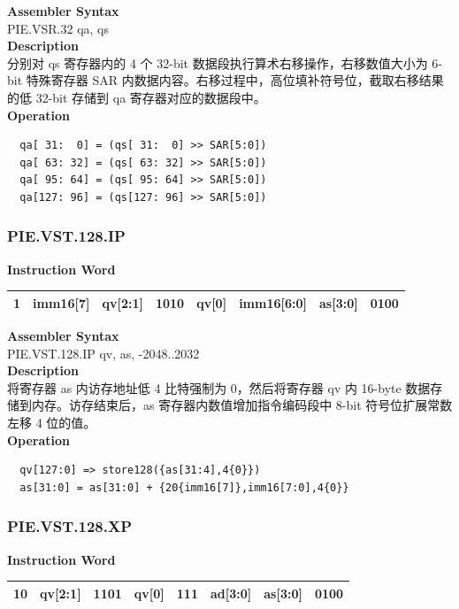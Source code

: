 \textbf{Assembler Syntax} \\
PIE.VSR.32 qa, qs \\
\textbf{Description} \\
分别对 qs 寄存器内的 4 个 32-bit 数据段执行算术右移操作，右移数值大小为 6-bit 特殊寄存器 SAR 内数据内容。右移过程中，高位填补符号位，截取右移结果的低 32-bit 存储到 qa 寄存器对应的数据段中。\\
\textbf{Operation}
\begin{lstlisting}
  qa[ 31:  0] = (qs[ 31:  0] >> SAR[5:0])
  qa[ 63: 32] = (qs[ 63: 32] >> SAR[5:0])
  qa[ 95: 64] = (qs[ 95: 64] >> SAR[5:0])
  qa[127: 96] = (qs[127: 96] >> SAR[5:0])
\end{lstlisting}

\newpage
\subsubsection{PIE.VST.128.IP}\label{instruction:PIEVST128IP}
\setlength\tabcolsep{6pt}
\textbf{Instruction Word} \\
\begin{tabular}{|c|c|c|c|c|c|c|c|}
	\hline
	1 & imm16[7] & qv[2:1] & 1010 & qv[0] & imm16[6:0] & as[3:0] & 0100 \\
	\hline
\end{tabular}

\textbf{Assembler Syntax} \\
PIE.VST.128.IP qv, as, -2048..2032 \\
\textbf{Description} \\
将寄存器 as 内访存地址低 4 比特强制为 0，然后将寄存器 qv 内 16-byte 数据存储到内存。访存结束后，as 寄存器内数值增加指令编码段中 8-bit 符号位扩展常数左移 4 位的值。\\
\textbf{Operation}
\begin{lstlisting}
  qv[127:0] => store128({as[31:4],4{0}})
  as[31:0] = as[31:0] + {20{imm16[7]},imm16[7:0],4{0}}
\end{lstlisting}

\newpage
\subsubsection{PIE.VST.128.XP}\label{instruction:PIEVST128XP}
\setlength\tabcolsep{6pt}
\textbf{Instruction Word} \\
\begin{tabular}{|c|c|c|c|c|c|c|c|}
	\hline
	10 & qv[2:1] & 1101 & qv[0] & 111 & ad[3:0] & as[3:0] & 0100 \\
	\hline
\end{tabular}

